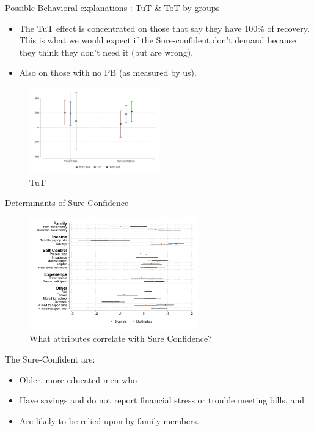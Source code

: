 \documentclass[8pt]{beamer}
\begin{document}
\begin{frame}{Possible Behavioral explanations : TuT \& ToT by groups}

\begin{itemize}
    \item The TuT effect is concentrated on those that say they have 100\% of recovery. This is what we would expect if the Sure-confident don't demand because they think they don't need it (but are wrong).
    \item Also on those with no PB (as measured by us).
\end{itemize}
\begin{figure}[H]
    \caption{TuT}
        \includegraphics[width=0.5\textwidth]{Figuras/tut_beh_partition.pdf}
\end{figure}
\end{frame}


\begin{frame}{Determinants of Sure Confidence}
    
        \begin{figure}
        \caption{What attributes correlate with Sure Confidence?}
        \centering
        \includegraphics[width=0.65\textwidth]{Figuras/determinants_confidence_100.pdf}
        \end{figure}

The Sure-Confident are:
\begin{itemize}
    \item   Older, more educated men who
    \item   Have savings and do not report financial stress or trouble meeting bills, and 
    \item   Are likely to be relied upon by family members.
\end{itemize}        


\end{frame}
\end{document}
